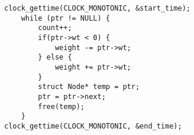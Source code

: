 \begin{lstlisting}[style=CStyle]
clock_gettime(CLOCK_MONOTONIC, &start_time);
    while (ptr != NULL) {
        count++;
        if(ptr->wt < 0) {
            weight -= ptr->wt;
        } else {
            weight += ptr->wt;
        }
        struct Node* temp = ptr;
        ptr = ptr->next;
        free(temp);
    }
clock_gettime(CLOCK_MONOTONIC, &end_time);
\end{lstlisting}
